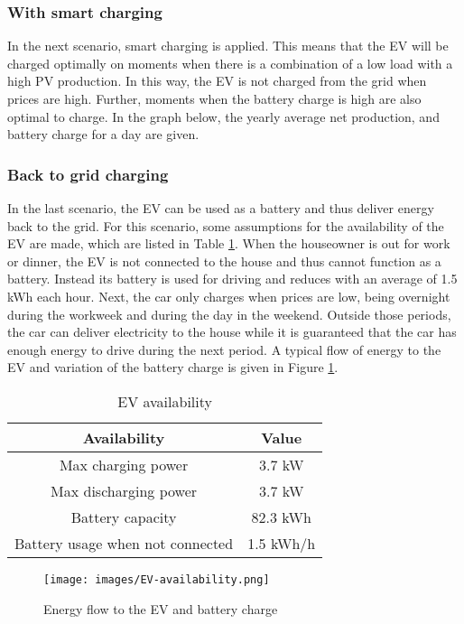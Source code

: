 \subsubsection{With smart charging}
In the next scenario, smart charging is applied. This means that the EV will be charged optimally on moments when there is a combination of a low load with a high PV production. In this way, the EV is not charged from the grid when prices are high. Further, moments when the battery charge is high are also optimal to charge. In the graph below, the yearly average net production, and battery charge for a day are given. 
\subsubsection{Back to grid charging}
 In the last scenario, the EV can be used as a battery and thus deliver energy back to the grid. For this scenario, some assumptions for the availability of the EV are made, which are listed in Table \ref{tab:EV-availability}. When the houseowner is out for work or dinner, the EV is not connected to the house and thus cannot function as a battery. Instead its battery is used for driving and reduces with an average of 1.5 kWh each hour. Next, the car only charges when prices are low, being overnight during the workweek and during the day in the weekend. Outside those periods, the car can deliver electricity to the house while it is guaranteed that the car has enough energy to drive during the next period. A typical flow of energy to the EV and variation of the battery charge is given in Figure \ref{fig:EV-availability}.

\begin{table}[H]
\centering
\begin{tabular}{|c|c|}
\hline
\textbf{Availability} & \textbf{Value} \\ \hline
Max charging power & 3.7 kW \\ \hline
Max discharging power & 3.7 kW \\ \hline
Battery capacity & 82.3 kWh \\ \hline
Battery usage when not connected & 1.5 kWh/h \\ \hline
\end{tabular}
\caption{EV availability}
\label{tab:EV-availability}
\end{table}

\begin{figure}[H]
    \centering
    \texttt{[image: images/EV-availability.png]}
    \caption{Energy flow to the EV and battery charge}
    \label{fig:EV-availability}
\end{figure}




